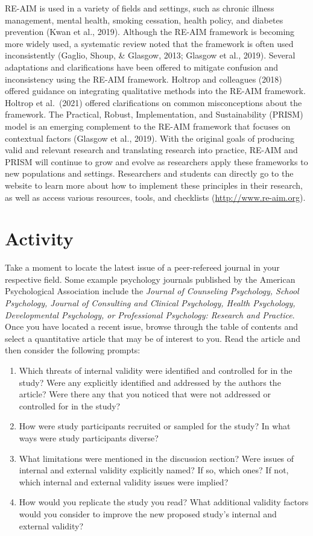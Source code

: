 \documentclass[
  11pt,
]{book}
\providecommand{\tightlist}{%
  \setlength{\itemsep}{0pt}\setlength{\parskip}{0pt}}
\begin{document}
RE-AIM is used in a variety of fields and settings, such as chronic illness management, mental health, smoking cessation, health policy, and diabetes prevention (Kwan et al., 2019). Although the RE-AIM framework is becoming more widely used, a systematic review noted that the framework is often used inconsistently (Gaglio, Shoup, \& Glasgow, 2013; Glasgow et al., 2019). Several adaptations and clarifications have been offered to mitigate confusion and inconsistency using the RE-AIM framework. Holtrop and colleagues (2018) offered guidance on integrating qualitative methods into the RE-AIM framework. Holtrop et al.~(2021) offered clarifications on common misconceptions about the framework. The Practical, Robust, Implementation, and Sustainability (PRISM) model is an emerging complement to the RE-AIM framework that focuses on contextual factors (Glasgow et al., 2019). With the original goals of producing valid and relevant research and translating research into practice, RE-AIM and PRISM will continue to grow and evolve as researchers apply these frameworks to new populations and settings. Researchers and students can directly go to the website to learn more about how to implement these principles in their research, as well as access various resources, tools, and checklists (\url{http://www.re-aim.org}).

\section{Activity}\label{activity}

Take a moment to locate the latest issue of a peer-refereed journal in your respective field. Some example psychology journals published by the American Psychological Association include the \emph{Journal of Counseling Psychology, School Psychology, Journal of Consulting and Clinical Psychology, Health Psychology, Developmental Psychology, or Professional Psychology: Research and Practice}. Once you have located a recent issue, browse through the table of contents and select a quantitative article that may be of interest to you. Read the article and then consider the following prompts:

\begin{enumerate}
\def\labelenumi{\arabic{enumi}.}
\tightlist
\item
  Which threats of internal validity were identified and controlled for in the study? Were any explicitly identified and addressed by the authors the article? Were there any that you noticed that were not addressed or controlled for in the study?
\item
  How were study participants recruited or sampled for the study? In what ways were study participants diverse?
\item
  What limitations were mentioned in the discussion section? Were issues of internal and external validity explicitly named? If so, which ones? If not, which internal and external validity issues were implied?
\item
  How would you replicate the study you read? What additional validity factors would you consider to improve the new proposed study's internal and external validity?
\end{enumerate}
\end{document}
